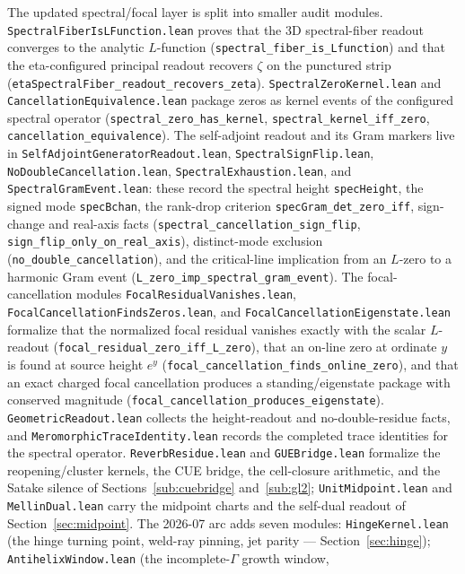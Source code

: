 \documentclass[11pt]{article}
\newcommand{\code}[1]{\texttt{#1}}
\begin{document}
The updated spectral/focal layer is split into smaller audit modules.  \code{SpectralFiberIsLFunction.lean}
proves that the 3D spectral-fiber readout converges to the analytic $L$-function
(\code{spectral\_fiber\_is\_Lfunction}) and that the eta-configured principal readout recovers
$\zeta$ on the punctured strip (\code{etaSpectralFiber\_readout\_recovers\_zeta}).
\code{SpectralZeroKernel.lean} and \code{CancellationEquivalence.lean} package zeros as kernel
events of the configured spectral operator (\code{spectral\_zero\_has\_kernel},
\code{spectral\_kernel\_iff\_zero}, \code{cancellation\_equivalence}).  The self-adjoint readout
and its Gram markers live in \code{SelfAdjointGeneratorReadout.lean},
\code{SpectralSignFlip.lean}, \code{NoDoubleCancellation.lean}, \code{SpectralExhaustion.lean},
and \code{SpectralGramEvent.lean}: these record the spectral height
\code{specHeight}, the signed mode \code{specBchan}, the rank-drop criterion
\code{specGram\_det\_zero\_iff}, sign-change and real-axis facts
(\code{spectral\_cancellation\_sign\_flip}, \code{sign\_flip\_only\_on\_real\_axis}), distinct-mode
exclusion (\code{no\_double\_cancellation}), and the critical-line implication from an $L$-zero to a
harmonic Gram event (\code{L\_zero\_imp\_spectral\_gram\_event}).  The focal-cancellation modules
\code{FocalResidualVanishes.lean}, \code{FocalCancellationFindsZeros.lean}, and
\code{FocalCancellationEigenstate.lean} formalize that the normalized focal residual vanishes exactly
with the scalar $L$-readout (\code{focal\_residual\_zero\_iff\_L\_zero}), that an on-line zero at
ordinate $y$ is found at source height $e^y$
(\code{focal\_cancellation\_finds\_online\_zero}), and that an exact charged focal cancellation
produces a standing/eigenstate package with conserved magnitude
(\code{focal\_cancellation\_produces\_eigenstate}).  \code{GeometricReadout.lean} collects the
height-readout and no-double-residue facts, and \code{MeromorphicTraceIdentity.lean} records the
completed trace identities for the spectral operator.  \code{ReverbResidue.lean} and
\code{GUEBridge.lean} formalize the reopening/cluster kernels, the CUE bridge, the cell-closure
arithmetic, and the Satake silence of Sections~\ref{sub:cuebridge} and~\ref{sub:gl2};
\code{UnitMidpoint.lean} and \code{MellinDual.lean} carry the midpoint charts and the self-dual
readout of Section~\ref{sec:midpoint}.  The 2026-07 arc adds seven modules:
\code{HingeKernel.lean} (the hinge turning point, weld-ray pinning, jet parity ---
Section~\ref{sec:hinge}); \code{AntihelixWindow.lean} (the incomplete-$\Gamma$ growth window,
\end{document}
